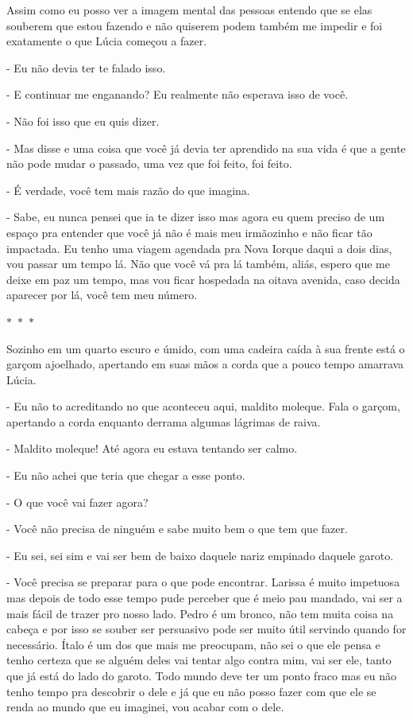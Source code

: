 Assim como eu posso ver a imagem mental das pessoas entendo que se elas souberem que estou fazendo e não quiserem podem também me impedir e foi exatamente o que Lúcia começou a fazer.

- Eu não devia ter te falado isso.

- E continuar me enganando? Eu realmente não esperava isso de você.

- Não foi isso que eu quis dizer.

- Mas disse e uma coisa que você já devia ter aprendido na sua vida é que a gente não pode mudar o passado, uma vez que foi feito, foi feito.

- É verdade, você tem mais razão do que imagina.

- Sabe, eu nunca pensei que ia te dizer isso mas agora eu quem preciso de um espaço pra entender que você já não é mais meu irmãozinho e não ficar tão impactada. Eu tenho uma viagem agendada pra Nova Iorque daqui a dois dias, vou passar um tempo lá. Não que você vá pra lá também, aliás, espero que me deixe em paz um tempo, mas vou ficar hospedada na oitava avenida, caso decida aparecer por lá, você tem meu número.

\begin{center}
	$\ast$~$\ast$~$\ast$
\end{center}

Sozinho em um quarto escuro e úmido, com uma cadeira caída à sua frente está o garçom ajoelhado, apertando em suas mãos a corda que a pouco tempo amarrava Lúcia.

- Eu não to acreditando no que aconteceu aqui, maldito moleque. Fala o garçom, apertando a corda enquanto derrama algumas lágrimas de raiva.

- Maldito moleque! Até agora eu estava tentando ser calmo.

- Eu não achei que teria que chegar a esse ponto.

- O que você vai fazer agora?

- Você não precisa de ninguém e sabe muito bem o que tem que fazer.

- Eu sei, sei sim e vai ser bem de baixo daquele nariz empinado daquele garoto.

- Você precisa se preparar para o que pode encontrar. Larissa é muito impetuosa mas depois de todo esse tempo pude perceber que é meio pau mandado, vai ser a mais fácil de trazer pro nosso lado. Pedro é um bronco, não tem muita coisa na cabeça e por isso se souber ser persuasivo pode ser muito útil servindo quando for necessário. Ítalo é um dos que mais me preocupam, não sei o que ele pensa e tenho certeza que se alguém deles vai tentar algo contra mim, vai ser ele, tanto que já está do lado do garoto. Todo mundo deve ter um ponto fraco mas eu não tenho tempo pra descobrir o dele e já que eu não posso fazer com que ele se renda ao mundo que eu imaginei, vou acabar com o dele.

